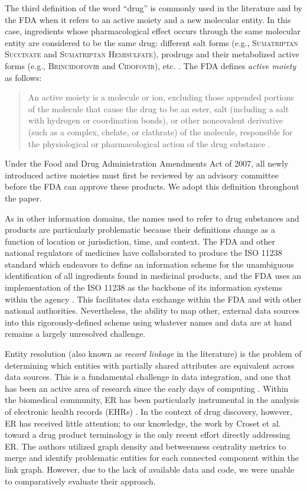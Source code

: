 \documentclass{bmcart}
\begin{document}
The third definition of the word ``drug'' is commonly used in
the literature and by the FDA when it refers to an active moiety
and a new molecular entity. In this case, ingredients whose
pharmacological effect occurs through the same molecular entity are
considered to be the same drug: different salt forms (e.g., 
\textsc{Sumatriptan Succinate} and \textsc{Sumatriptan Hemisulfate}), 
prodrugs and their metabolized active forms (e.g., \textsc{Brincidofovir} 
and \textsc{Cidofovir}), etc. \cite{NME}. The FDA defines \emph{active moiety} as follows:
\begin{quote}An active moiety is a molecule or
ion, excluding those appended portions of the molecule that cause the
drug to be an ester, salt (including a salt with hydrogen or
coordination bonds), or other noncovalent derivative (such as a
complex, chelate, or clathrate) of the molecule, responsible for the
physiological or pharmacological action of the drug
substance \cite{CFR2012}.
\end{quote}
Under the Food and Drug Administration Amendments Act of 2007, 
all newly introduced active moieties must first be reviewed by 
an advisory committee before the FDA can approve these products. 
We adopt this definition throughout the paper.

As in other information domains, the names used to refer to drug
substances and products are particularly problematic because their
definitions change as a function of location or jurisdiction, time, and
context. The FDA and other national regulators of medicines have
collaborated to produce the ISO 11238 standard \cite{ISO11238} which endeavors to
define an information scheme for the unambiguous identification of all
ingredients found in medicinal products, and the FDA uses an
implementation of the ISO 11238 as the backbone of its information systems
within the agency \cite{GSRS}. This facilitates data exchange within
the FDA and with other national authorities. Nevertheless, the ability to map other, 
external data sources into this rigorously-defined scheme using 
whatever names and data are at hand remains a largely unresolved challenge. 

Entity resolution (also known as \emph{record linkage} in the
literature) is the problem of determining which entities with
partially shared attributes are equivalent across data sources. This
is a fundamental challenge in data integration, and one that has been
an active area of research since the early days of computing
\cite{Newcombe1959}. Within the biomedical community, ER has been
particularly instrumental in the analysis of electronic health records
(EHRs) \cite{Karr2019}. In the context of drug discovery, however, ER
has received little attention; to our knowledge, the work by Croset
et al. toward a drug product terminology \cite{Croset2015} is the only
recent effort directly addressing ER. The authors utilized
graph density and betweenness centrality metrics to merge and identify 
problematic entities for each connected component within the link
graph. However, due to the lack of available data and code, we were
unable to comparatively evaluate their approach.
\end{document}

